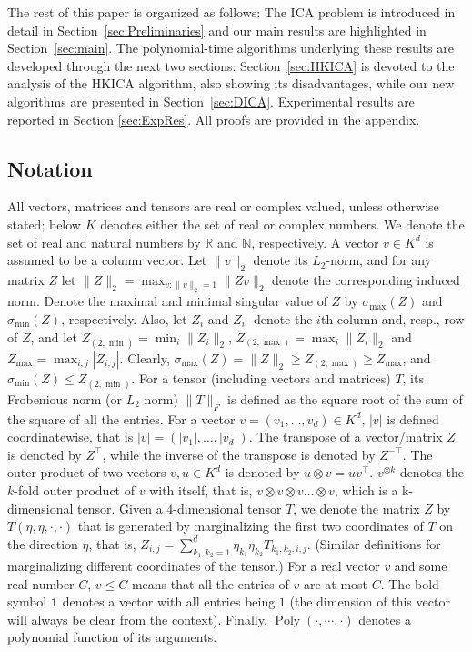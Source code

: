 \documentclass[jmlr]{article}
\newcommand{\real}{\mathbb{R}}
\renewcommand{\natural}{\mathbb{N}}
\DeclareMathOperator{\pol}{Poly}
\newcommand{\poly}[1]{\pol\left(#1\right)}
\theoremstyle{definition}
\begin{document}
The rest of this paper is organized as follows: 
The ICA problem is introduced in detail in Section~\ref{sec:Preliminaries} and  our main results are highlighted in Section~\ref{sec:main}.
The polynomial-time algorithms underlying these results are developed through the next two sections: Section~\ref{sec:HKICA} is devoted to the analysis of the HKICA algorithm, also showing its disadvantages, while our new algorithms are presented in Section~\ref{sec:DICA}.
Experimental results are reported in Section \ref{sec:ExpRes}.
All proofs are provided in the appendix.

\subsection{Notation}
All vectors, matrices and tensors are real or complex valued, unless otherwise stated; below $K$ denotes either the set of real or complex numbers. We denote the set of real and natural numbers by $\real$ and $\natural$, respectively.
A vector $v \in K^d$ is assumed to be a column vector.
Let $\|v\|_2$ denote its $L_2$-norm, and for any matrix $Z$ let $\|Z\|_2=\max_{v:\|v\|_2=1}{\|Z v\|_2}$ denote the corresponding induced norm. Denote the maximal and minimal singular value of $Z$ by $\sigma_{\max}(Z)$ and  $\sigma_{\min}(Z)$, respectively. Also, let $Z_i$ and $Z_{i:}$ denote the $i$th column and, resp., row of $Z$, and let $Z_{(2,\min)} = \min_{i} \|Z_i\|_2$, $Z_{(2,\max)} = \max_{i} \|Z_i\|_2$ and $Z_{\max} = \max_{i,j} |Z_{i,j}|$. 
Clearly, $\sigma_{\max}(Z) =\|Z\|_2 \ge Z_{(2,\max)} \ge Z_{\max}$, and $\sigma_{\min}(Z) \le Z_{(2,\min)}$. For a tensor (including vectors and matrices) $T$, its Frobenious norm (or $L_2$ norm) $\|T\|_F$  is defined as the square root of the sum of the square of all the entries.  
For a vector $v=(v_1,\ldots,v_d) \in K^d$, $\vert v \vert$ is defined coordinatewise, that is $\vert v \vert=(\vert v_1 \vert,\ldots,\vert v_d\vert)$. 
The transpose of a vector/matrix $Z$ is denoted by $Z^\top$, while the inverse of the transpose is denoted by $Z^{-\top}$.  
The outer product of two vectors $v, u \in K^d$ is denoted by $u\otimes v=u v^\top$. 
$v^{\otimes k}$ denotes the $k$-fold outer product of $v$ with itself, that is, $v\otimes v\otimes v \ldots \otimes v$, which is a k-dimensional tensor.
Given a $4$-dimensional tensor $T$, we denote the matrix $Z$ by $T(\eta,\eta,\cdot , \cdot)$ that is generated by marginalizing the first two coordinates of $T$ on the direction $\eta$, that is,
$Z_{i,j} = \sum_{k_1,k_2 = 1}^{d} \eta_{k_1} \eta_{k_2} T_{k_1,k_2,i,j}$. (Similar definitions for marginalizing different coordinates of the tensor.)
For a real vector $v$ and some real number $C$, $v \le C$ means that all the entries of $v$ are at most $C$. 
The bold symbol $\boldsymbol{1}$ denotes a vector with all entries being $1$ (the dimension of this vector will always be clear from the context).
Finally, $\poly{\cdot,\cdots,\cdot}$ denotes a polynomial function of its arguments.
\end{document}
